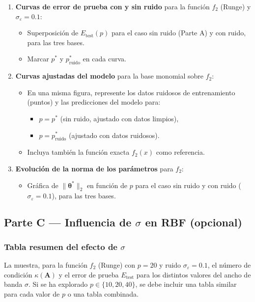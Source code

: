 \begin{enumerate}[leftmargin=2em, label=\textbf{B\arabic*.}]
  \item \textbf{Curvas de error de prueba con y sin ruido} para la función \(f_2\) (Runge) y \(\sigma_\varepsilon = 0.1\):
    \begin{itemize}
      \item Superposición de \(E_{\mathrm{test}}(p)\) para el caso sin ruido (Parte A) y con ruido, para las tres bases.
      \item Marcar \(p^*\) y \(p^*_{\text{ruido}}\) en cada curva.
    \end{itemize}
  \item \textbf{Curvas ajustadas del modelo} para la base monomial sobre \(f_2\):
    \begin{itemize}
      \item En una misma figura, represente los datos ruidosos de entrenamiento (puntos) y las predicciones del modelo para:
        \begin{itemize}
          \item \(p = p^*\) (sin ruido, ajustado con datos limpios),
          \item \(p = p^*_{\text{ruido}}\) (ajustado con datos ruidosos).
        \end{itemize}
      \item Incluya también la función exacta \(f_2(x)\) como referencia.
    \end{itemize}
  \item \textbf{Evolución de la norma de los parámetros} para \(f_2\):
    \begin{itemize}
      \item Gráfica de \(\|\boldsymbol{\theta}^*\|_2\) en función de \(p\) para el caso sin ruido y con ruido (\(\sigma_\varepsilon = 0.1\)), para las tres bases.
    \end{itemize}
\end{enumerate}

\subsection*{Parte C — Influencia de $\sigma$ en RBF (opcional)}

\subsubsection*{Tabla resumen del efecto de $\sigma$}

La  muestra, para la función \(f_2\) (Runge) con \(p=20\) y ruido \(\sigma_\varepsilon = 0.1\), el número de condición \(\kappa(\mathbf{A})\) y el error de prueba \(E_{\mathrm{test}}\) para los distintos valores del ancho de banda \(\sigma\). Si se ha explorado \(p \in \{10,20,40\}\), se debe incluir una tabla similar para cada valor de \(p\) o una tabla combinada.


